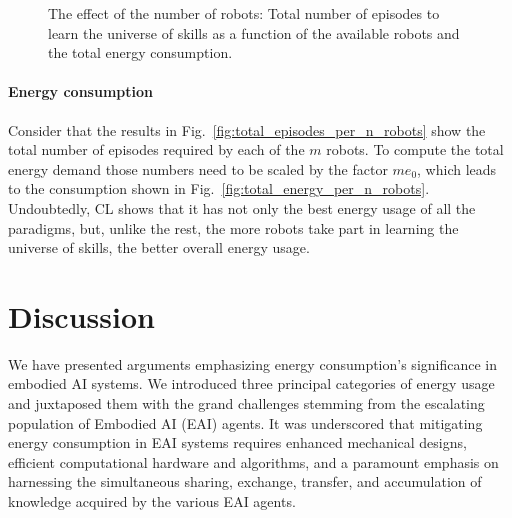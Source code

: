 \documentclass[12pt]{article}
\begin{document}
\begin{figure}[!h]
\begin{subfigure}[t]{0.45\textwidth}
	\end{subfigure}
	\hspace*{\fill}
	\caption[] {\label{fig:final_results} The effect of the number of robots:  Total number of episodes to learn the universe of skills as a function of the available robots and  the total energy consumption.}
\end{figure}

\paragraph*{Energy consumption}
Consider that the results in Fig.~\ref{fig:total_episodes_per_n_robots} show the total number of episodes required by each of the $m$ robots. To compute the total energy demand those numbers need to be scaled by the factor $m e_0$, which leads to the consumption shown in Fig.~\ref{fig:total_energy_per_n_robots}. Undoubtedly, CL shows that it has not only the best energy usage of all the paradigms, but, unlike the rest, the more robots take part in learning the universe of skills, the better overall energy usage.

\section*{Discussion}\label{sec:discussion}
We have presented arguments emphasizing energy consumption's significance in embodied AI systems. We introduced three principal categories of energy usage and juxtaposed them with the grand challenges stemming from the escalating population of Embodied AI (EAI) agents. It was underscored that mitigating energy consumption in EAI systems requires enhanced mechanical designs, efficient computational hardware and algorithms, and a paramount emphasis on harnessing the simultaneous sharing, exchange, transfer, and accumulation of knowledge acquired by the various EAI agents.
\end{document}
